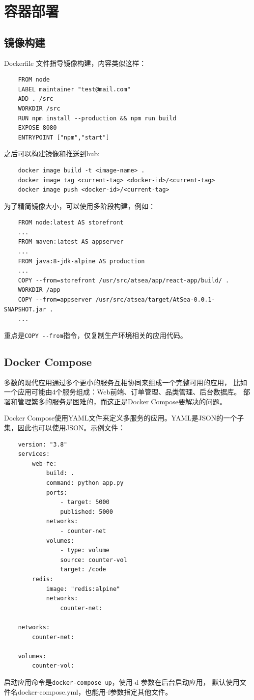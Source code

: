 \section{容器部署}
\subsection{镜像构建}
Dockerfile 文件指导镜像构建，内容类似这样：
\begin{verbatim}
	FROM node
	LABEL maintainer "test@mail.com"
	ADD . /src
	WORKDIR /src
	RUN npm install --production && npm run build
	EXPOSE 8080
	ENTRYPOINT ["npm","start"]
\end{verbatim}
之后可以构建镜像和推送到hub:
\begin{verbatim}
	docker image build -t <image-name> .
	docker image tag <current-tag> <docker-id>/<current-tag>
	docker image push <docker-id>/<current-tag>
\end{verbatim}
为了精简镜像大小，可以使用多阶段构建，例如：
\begin{verbatim}
	FROM node:latest AS storefront
	...
	FROM maven:latest AS appserver
	...
	FROM java:8-jdk-alpine AS production
	...
	COPY --from=storefront /usr/src/atsea/app/react-app/build/ .
	WORKDIR /app
	COPY --from=appserver /usr/src/atsea/target/AtSea-0.0.1-SNAPSHOT.jar .
	...
\end{verbatim}
重点是\verb|COPY --from|指令，仅复制生产环境相关的应用代码。

\subsection{Docker Compose}
多数的现代应用通过多个更小的服务互相协同来组成一个完整可用的应用，
比如一个应用可能由4个服务组成：Web前端、订单管理、品类管理、后台数据库。
部署和管理繁多的服务是困难的，而这正是Docker Compose要解决的问题。

Docker Compose使用YAML文件来定义多服务的应用。YAML是JSON的一个子集，因此也可以使用JSON。示例文件：
\begin{verbatim}
    version: "3.8"
    services:
        web-fe:
            build: .
            command: python app.py
            ports:
                - target: 5000
                published: 5000
            networks:
                - counter-net
            volumes:
                - type: volume
                source: counter-vol
                target: /code
        redis:
            image: "redis:alpine"
            networks:
                counter-net:

    networks:
        counter-net:

    volumes:
        counter-vol:
\end{verbatim}

启动应用命令是\verb|docker-compose up|，使用-d 参数在后台启动应用，
默认使用文件名docker-compose.yml，也能用-f参数指定其他文件。